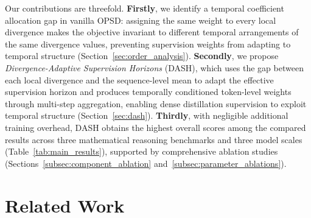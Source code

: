 \documentclass[letterpaper]{article} %
\begin{document}
Our contributions are threefold. \textbf{Firstly}, we identify a temporal coefficient allocation gap in vanilla OPSD: assigning the same weight to every local divergence makes the objective invariant to different temporal arrangements of the same divergence values, preventing supervision weights from adapting to temporal structure (Section~\ref{sec:order_analysis}). \textbf{Secondly}, we propose \emph{Divergence-Adaptive Supervision Horizons} (DASH), which uses the gap between each local divergence and the sequence-level mean to adapt the effective supervision horizon and produces temporally conditioned token-level weights through multi-step aggregation, enabling dense distillation supervision to exploit temporal structure (Section~\ref{sec:dash}). \textbf{Thirdly}, with negligible additional training overhead, DASH obtains the highest overall scores among the compared results across three mathematical reasoning benchmarks and three model scales (Table~\ref{tab:main_results}), supported by comprehensive ablation studies (Sections~\ref{subsec:component_ablation} and~\ref{subsec:parameter_ablations}).








\section{Related Work}
\end{document}
